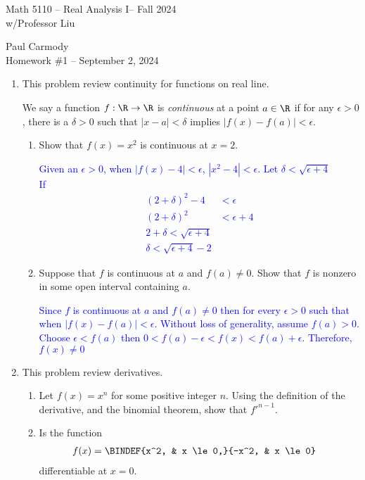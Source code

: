 \documentclass[10pt,a4paper]{report}
\newcommand{\CLASSNAME}{Math 5110 -- Real Analysis I}
\newcommand{\STUDENTNAME}{Paul Carmody}
\newcommand{\ASSIGNMENT}{Homework \#1 }
\newcommand{\DUEDATE}{September 2, 2024}
\newcommand{\SEMESTER}{Fall 2024}
\newcommand{\BLUE}[1]{\textcolor{blue}{#1}}
\begin{document}
\begin{center}
	\Large{\CLASSNAME -- \SEMESTER} \\
	\large{ w/Professor Liu}
\end{center}
\begin{center}
	\STUDENTNAME \\
	\ASSIGNMENT -- \DUEDATE\\
\end{center} 

\begin{enumerate}[label=\Roman*.]
\item This problem review continuity for functions on real line.

We say a function $f: \R \to \R$ is \textit{continuous} at a point $a \in \R$ if for any $\epsilon > 0$, there is a $\delta > 0$ such that $|x-a| < \delta$ implies $|f(x)-f(a)|< \epsilon$.
\begin{enumerate}[label=(\alph*)]
\item Show that $f(x)=x^2$ is continuous at $x=2$.

\BLUE{Given an $\epsilon > 0$, when $|f(x)-4|< \epsilon$, $ |x^2 -4| < \epsilon$.  Let $\delta < \sqrt{\epsilon + 4}$ \\
If \begin{align*}
	(2+\delta)^2-4 &< \epsilon \\
	(2+\delta)^2&< \epsilon +4\\
	2+\delta < \sqrt{\epsilon +4} \\
	\delta < \sqrt{\epsilon+4}-2
\end{align*} }

\item Suppose that $f$ is continuous at $a$ and $f(a) \ne 0$. Show that $f$ is nonzero in some open interval containing $a$.

\BLUE{Since $f$ is continuous at $a$ and $f(a) \ne 0$ then for every $\epsilon > 0$ such that when $|f(x)-f(a)| < \epsilon$.  Without loss of generality, assume $f(a) > 0$.  Choose $\epsilon < f(a)$ then $0 < f(a)-\epsilon < f(x) < f(a) + \epsilon$.  Therefore, $f(x) \ne 0$ }

\end{enumerate}

\item This problem review derivatives.
\begin{enumerate}[label=(\alph*)]
\item Let $f(x)=x^n$ for some positive integer $n$.  Using the definition of the derivative, and the binomial theorem, show that $f'^{n-1}$.
\item Is the function 
\begin{align*}
	f(x) &= \BINDEF{x^2, & x \le 0,}{-x^2, & x \le 0}
\end{align*}differentiable at $x=0$.


\end{enumerate}
\end{enumerate}
\end{document}

